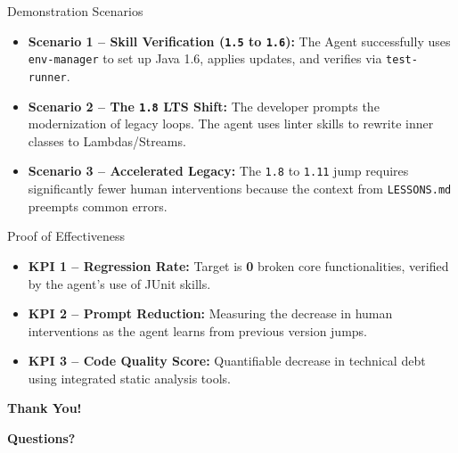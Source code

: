 \documentclass[aspectratio=169]{beamer}
\begin{document}
\begin{frame}{Demonstration Scenarios}
\begin{itemize}
  \item \textbf{Scenario 1 -- Skill Verification (\texttt{1.5} to \texttt{1.6}):} The Agent successfully uses \texttt{env-manager} to set up Java 1.6, applies updates, and verifies via \texttt{test-runner}.
  \item \textbf{Scenario 2 -- The \texttt{1.8} LTS Shift:} The developer prompts the modernization of legacy loops. The agent uses linter skills to rewrite inner classes to Lambdas/Streams.
  \item \textbf{Scenario 3 -- Accelerated Legacy:} The \texttt{1.8} to \texttt{1.11} jump requires significantly fewer human interventions because the context from \texttt{LESSONS.md} preempts common errors.
\end{itemize}
\end{frame}

\begin{frame}{Proof of Effectiveness}
\begin{itemize}
  \item \textbf{KPI 1 -- Regression Rate:} Target is \textbf{0} broken core functionalities, verified by the agent's use of JUnit skills.
  \item \textbf{KPI 2 -- Prompt Reduction:} Measuring the decrease in human interventions as the agent learns from previous version jumps.
  \item \textbf{KPI 3 -- Code Quality Score:} Quantifiable decrease in technical debt using integrated static analysis tools.
\end{itemize}
\end{frame}

\begin{frame}[plain]
  \centering
  \Huge \textbf{Thank You!}

  \vspace{1.2em}
  \Large \textbf{Questions?}
\end{frame}
\end{document}
